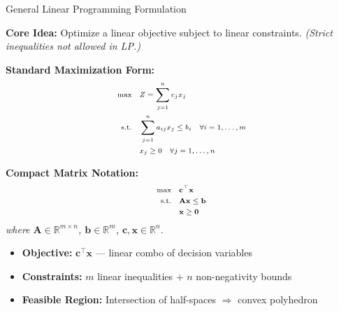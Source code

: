 \documentclass{beamer}
\begin{document}
\begin{frame}{General Linear Programming Formulation}
  \footnotesize  %
  
  \textbf{Core Idea:} Optimize a linear objective subject to linear constraints.
  \textit{\scriptsize (Strict inequalities not allowed in LP.)}

  \vspace{0.15cm}

  \textbf{Standard Maximization Form:}
  \[
    \scriptsize
    \setlength{\arraycolsep}{2pt}
    \begin{aligned}
      \max \quad & Z = \sum_{j=1}^{n} c_j x_j \\
      \text{s.t.} \quad & \sum_{j=1}^{n} a_{ij} x_j \leq b_i \quad \forall i = 1,\dots,m \\
                        & x_j \geq 0 \quad \forall j = 1,\dots,n
    \end{aligned}
  \]

  \vspace{0.1cm}
  \textbf{Compact Matrix Notation:}
  \[
    \scriptsize
    \begin{aligned}
      \max \quad & \mathbf{c}^\top \mathbf{x} \\
      \text{s.t.} \quad & \mathbf{A}\mathbf{x} \leq \mathbf{b} \\
                        & \mathbf{x} \geq \mathbf{0}
    \end{aligned}
  \]
  \textit{\scriptsize where $\mathbf{A} \in \mathbb{R}^{m \times n}$, $\mathbf{b} \in \mathbb{R}^m$, $\mathbf{c}, \mathbf{x} \in \mathbb{R}^n$.}

  \vspace{0.1cm}
  \begin{itemize}%
    \item \textbf{Objective:} $\mathbf{c}^\top \mathbf{x}$ — linear combo of decision variables
    \item \textbf{Constraints:} $m$ linear inequalities $+$ $n$ non-negativity bounds
    \item \textbf{Feasible Region:} Intersection of half-spaces $\Rightarrow$ convex polyhedron
  \end{itemize}
\end{frame}
\end{document}
